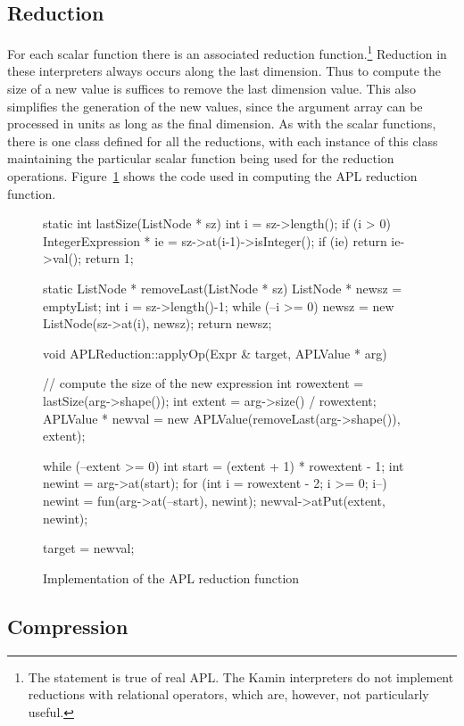 \subsection{Reduction}

For each scalar function there is an associated reduction
function.\footnote{The statement is true of real APL.  The Kamin
interpreters do not implement reductions with relational operators, which
are, however, not particularly useful.}  Reduction in these interpreters always
occurs along the last dimension.  Thus to compute the size of a new value
is suffices to remove the last dimension value.  This also simplifies the
generation of the new values, since the argument array can be processed in
units as long as the final dimension.  As with the scalar functions,
there is one class defined for all the reductions, with each instance of
this class maintaining the particular scalar function being used for the
reduction operations.  Figure~\ref{reduction} shows the code used in
computing the APL reduction function.

\begin{figure}
\begin{cprog}
static int lastSize(ListNode * sz)
{
	int i = sz->length();
	if (i > 0) {
		IntegerExpression * ie = sz->at(i-1)->isInteger();
		if (ie)
			return ie->val();
		}
	return 1;
}

static ListNode * removeLast(ListNode * sz)
{
	ListNode * newsz = emptyList;
	int i = sz->length()-1;
	while (--i >= 0)
		newsz = new ListNode(sz->at(i), newsz);
	return newsz;
}

void APLReduction::applyOp(Expr & target, APLValue * arg)
{
	// compute the size of the new expression
	int rowextent = lastSize(arg->shape());
	int extent = arg->size() / rowextent;
	APLValue * newval = new APLValue(removeLast(arg->shape()), extent);

	while (--extent >= 0) {
		int start = (extent + 1) * rowextent - 1;
		int newint = arg->at(start);
		for (int i = rowextent - 2; i >= 0; i--)
			newint = fun(arg->at(--start), newint);
		newval->atPut(extent, newint);
		}

	target = newval;
}
\end{cprog}
\caption{Implementation of the APL reduction function}\label{reduction}
\end{figure}

\subsection{Compression}

